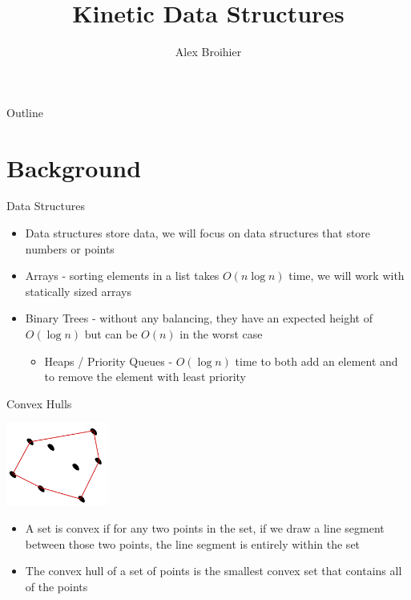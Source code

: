 \documentclass[aspectratio=169, handout]{beamer}
\title{Kinetic Data Structures}
\author{Alex Broihier}
\date{}
\begin{document}

\begin{frame}
\titlepage
\end{frame}

\begin{frame}{Outline}
  \tableofcontents
\end{frame}

\section{Background}
\frame{\sectionpage}

\begin{frame}{Data Structures}
    \begin{itemize}
        \item Data structures store data, we will focus on data structures that store numbers or points
        \item Arrays - sorting elements in a list takes $O(n \log n)$ time, we will work with statically sized arrays
        \item Binary Trees - without any balancing, they have an expected height of $O(\log n)$ but can be $O(n)$ in the worst case
        \begin{itemize}
            \item Heaps / Priority Queues - $O(\log n)$ time to both add an element and to remove the element with least priority
        \end{itemize}
    \end{itemize}
\end{frame}

\begin{frame}{Convex Hulls}
    \begin{center}
        \includegraphics[width=0.25\textwidth]{convex_hull.png}
    \end{center}
    \begin{itemize}
        \item A set is convex if for any two points in the set, if we draw a line segment between those two points, the line segment is entirely within the set
        \item The convex hull of a set of points is the smallest convex set that contains all of the points
    \end{itemize}
\end{frame}
\end{document}
